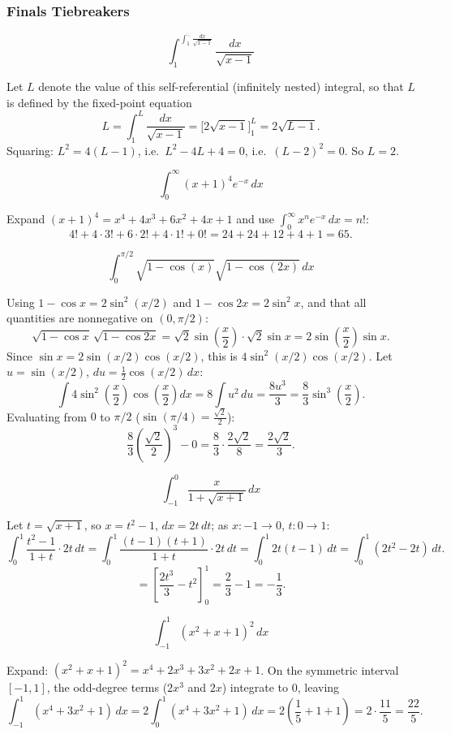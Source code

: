 \subsubsection*{Finals Tiebreakers}
\begin{questions}

\question \[\int_1^{\int_1^{\ddots}\frac{dx}{\sqrt{x-1}}}\frac{dx}{\sqrt{x-1}}\]
\begin{solution}
Let $L$ denote the value of this self-referential (infinitely nested) integral, so that $L$ is defined by the fixed-point equation
\[
L=\int_1^L \frac{dx}{\sqrt{x-1}}=\Big[2\sqrt{x-1}\Big]_1^L=2\sqrt{L-1}.
\]
Squaring: $L^2=4(L-1)$, i.e.\ $L^2-4L+4=0$, i.e.\ $(L-2)^2=0$. So $L=2$.
\end{solution}

\question \[\int_0^\infty (x+1)^4 e^{-x}\,dx\]
\begin{solution}
Expand $(x+1)^4=x^4+4x^3+6x^2+4x+1$ and use $\displaystyle\int_0^\infty x^n e^{-x}\,dx=n!$:
\[
4!+4\cdot3!+6\cdot2!+4\cdot1!+0!=24+24+12+4+1=65.
\]
\end{solution}

\question \[\int_0^{\pi/2} \sqrt{1-\cos(x)}\sqrt{1-\cos(2x)}\,dx\]
\begin{solution}
Using $1-\cos x=2\sin^2(x/2)$ and $1-\cos2x=2\sin^2x$, and that all quantities are nonnegative on $(0,\pi/2)$:
\[
\sqrt{1-\cos x}\,\sqrt{1-\cos2x}=\sqrt2\sin\!\left(\frac x2\right)\cdot\sqrt2\sin x=2\sin\!\left(\frac x2\right)\sin x.
\]
Since $\sin x=2\sin(x/2)\cos(x/2)$, this is $4\sin^2(x/2)\cos(x/2)$. Let $u=\sin(x/2)$, $du=\tfrac12\cos(x/2)\,dx$:
\[
\int 4\sin^2\!\left(\frac x2\right)\cos\!\left(\frac x2\right)dx=8\int u^2\,du=\frac{8u^3}{3}=\frac83\sin^3\!\left(\frac x2\right).
\]
Evaluating from $0$ to $\pi/2$ ($\sin(\pi/4)=\tfrac{\sqrt2}{2}$):
\[
\frac83\left(\frac{\sqrt2}{2}\right)^3-0=\frac83\cdot\frac{2\sqrt2}{8}=\frac{2\sqrt2}{3}.
\]
\end{solution}

\question \[\int_{-1}^0 \frac{x}{1+\sqrt{x+1}}\,dx\]
\begin{solution}
Let $t=\sqrt{x+1}$, so $x=t^2-1$, $dx=2t\,dt$; as $x:-1\to0$, $t:0\to1$:
\[
\int_0^1 \frac{t^2-1}{1+t}\cdot2t\,dt=\int_0^1 \frac{(t-1)(t+1)}{1+t}\cdot2t\,dt=\int_0^1 2t(t-1)\,dt=\int_0^1(2t^2-2t)\,dt.
\]
\[
=\left[\frac{2t^3}{3}-t^2\right]_0^1=\frac23-1=-\frac13.
\]
\end{solution}

\question \[\int_{-1}^1 (x^2+x+1)^2\,dx\]
\begin{solution}
Expand: $(x^2+x+1)^2=x^4+2x^3+3x^2+2x+1$. On the symmetric interval $[-1,1]$, the odd-degree terms ($2x^3$ and $2x$) integrate to $0$, leaving
\[
\int_{-1}^1 (x^4+3x^2+1)\,dx=2\int_0^1(x^4+3x^2+1)\,dx=2\left(\frac15+1+1\right)=2\cdot\frac{11}{5}=\frac{22}{5}.
\]
\end{solution}

\end{questions}